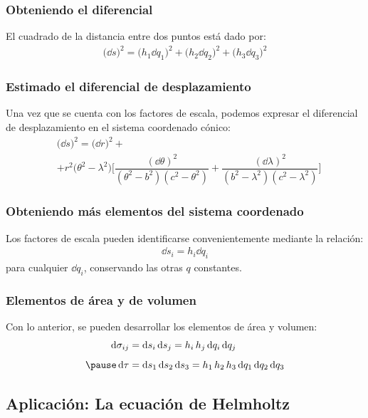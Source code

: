 \documentclass[12pt]{beamer}
\begin{document}
\begin{frame}
\frametitle{Obteniendo el diferencial}
El cuadrado de la distancia entre dos puntos está dado por:
\pause
\begin{align*}
\big( \dd{s} \big)^{2} = \big( h_{1} \dd{q_{1}} \big)^{2} + \big( h_{2} \dd{q_{2}} \big)^{2} + \big( h_{3} \dd{q_{3}} \big)^{2}
\end{align*}
\end{frame}
\begin{frame}
\frametitle{Estimado el diferencial de desplazamiento}
Una vez que se cuenta con los factores de escala, podemos expresar el diferencial de desplazamiento en el sistema coordenado cónico:
\pause
\begin{align*}
&\big( \dd{s} \big)^{2} = \big( \dd{r} \big)^{2} + \\[0.5em]
&+ r^{2} \big( \theta^{2} {-} \lambda^{2} \big) \bigg[ \dfrac{(\dd{\theta})^{2}}{(\theta^{2} {-} b^{2})(c^{2} {-} \theta^{2})} {+} \dfrac{(\dd{\lambda})^{2}}{(b^{2} {-} \lambda^{2})(c^{2} {-} \lambda^{2})} \bigg]
\end{align*}
\end{frame}
\begin{frame}
\frametitle{Obteniendo más elementos del sistema coordenado}
Los factores de escala pueden identificarse convenientemente mediante la relación:
\pause
\begin{align*}
\dd{s_{i}} = h_{i} \dd{q_{i}}
\end{align*}
para cualquier $\dd{q_{i}}$, conservando las otras $q$ constantes.
\end{frame}
\begin{frame}
\frametitle{Elementos de área y de volumen}
Con lo anterior, se pueden desarrollar los elementos de área y volumen:
\pause
\begin{eqnarray*}
\begin{aligned}
\dd{\sigma_{ij}} &= \dd{s_{i}} \dd{s_{j}} = h_{i} \, h_{j} \dd{q_{i}} \dd{q_{j}} \\[0.5em] \pause
\dd{\tau} &= \dd{s_{1}} \dd{s_{2}} \dd{s_{3}}= h_{1} \, h_{2} \, h_{3} \dd{q_{1}} \dd{q_{2}} \dd{q_{3}}
\end{aligned}
\end{eqnarray*}
\end{frame}

\subsection{Aplicación: La ecuación de Helmholtz}
\end{document}
